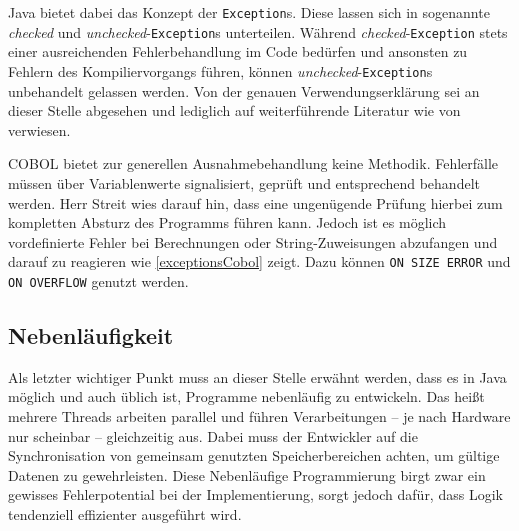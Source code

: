 Java bietet dabei das Konzept der \texttt{Exception}s. Diese lassen sich in sogenannte \textit{checked} und \textit{unchecked}-\texttt{Exception}s unterteilen. Während \textit{checked}-\texttt{Exception} stets einer ausreichenden Fehlerbehandlung im Code bedürfen und ansonsten zu Fehlern des Kompiliervorgangs führen, können \textit{unchecked}-\texttt{Exception}s unbehandelt gelassen werden. Von der genauen Verwendungserklärung sei an dieser Stelle abgesehen und lediglich auf weiterführende Literatur wie  von \citeauthor{byrne_java_2009-1} verwiesen.

COBOL bietet zur generellen Ausnahmebehandlung keine Methodik. Fehlerfälle müssen über Variablenwerte signalisiert, geprüft und entsprechend behandelt werden. Herr Streit wies darauf hin, dass eine ungenügende Prüfung hierbei zum kompletten Absturz des Programms führen kann. Jedoch ist es möglich vordefinierte Fehler bei Berechnungen oder String-Zuweisungen abzufangen und darauf zu reagieren wie \autoref{exceptionsCobol} zeigt. Dazu können \texttt{ON SIZE ERROR} und \texttt{ON OVERFLOW} genutzt werden.


\subsection{Nebenläufigkeit}

Als letzter wichtiger Punkt muss an dieser Stelle erwähnt werden, dass es in Java möglich und auch üblich ist, Programme nebenläufig zu entwickeln. Das heißt mehrere Threads arbeiten parallel und führen Verarbeitungen -- je nach Hardware nur scheinbar -- gleichzeitig aus. Dabei muss der Entwickler auf die Synchronisation von gemeinsam genutzten Speicherbereichen achten, um gültige Datenen zu gewehrleisten. Diese Nebenläufige Programmierung birgt zwar ein gewisses Fehlerpotential bei der Implementierung, sorgt jedoch dafür, dass Logik tendenziell effizienter ausgeführt wird.

